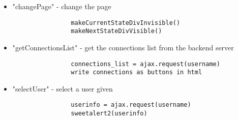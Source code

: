 \begin{itemize}
            \item "changePage" - change the page
            \begin{lstlisting}
                makeCurrentStateDivInvisible()
                makeNextStateDivVisible()
            \end{lstlisting}
            \item "getConnectionsList" - get the connections list from the backend server
            \begin{lstlisting}
                connections_list = ajax.request(username)
                write connections as buttons in html
            \end{lstlisting}
            \item "selectUser" - select a user given
            \begin{lstlisting}
                userinfo = ajax.request(username)
                sweetalert2(userinfo)
            \end{lstlisting}

\end{itemize}
